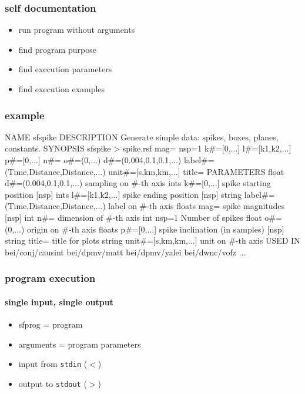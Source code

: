 \begin{frame} \frametitle{self documentation}

  \begin{itemize}
  \item run program without arguments
  \item find program purpose
  \item find execution parameters
  \item find execution examples
  \end{itemize}
  
\end{frame}
\cwpnote{}

\begin{frame}[fragile] \frametitle{example}


\tiny
\begin{semiverbatim}
NAME
        sfspike
DESCRIPTION
        Generate simple data: spikes, boxes, planes, constants.
SYNOPSIS
        sfspike > spike.rsf mag= nsp=1 k#=[0,...] l#=[k1,k2,...] p#=[0,...] n#=
o#=(0,...) d#=(0.004,0.1,0.1,...) label#=(Time,Distance,Distance,...) unit#=[s,km,km,...] title=
PARAMETERS
        float   d#=(0.004,0.1,0.1,...)  sampling on #-th axis
        ints    k#=[0,...]      spike starting position  [nsp]
        ints    l#=[k1,k2,...]  spike ending position  [nsp]
        string  label#=(Time,Distance,Distance,...)     label on #-th axis
        floats  mag=    spike magnitudes  [nsp]
        int     n#=     dimension of #-th axis
        int     nsp=1   Number of spikes
        float   o#=(0,...)      origin on #-th axis
        floats  p#=[0,...]      spike inclination (in samples)  [nsp]
        string  title=  title for plots
        string  unit#=[s,km,km,...]     unit on #-th axis
USED IN
        bei/conj/causint
        bei/dpmv/matt
        bei/dpmv/yalei
        bei/dwnc/vofz
	...
\end{semiverbatim}
\end{frame}
\cwpnote{}

\begin{frame} \frametitle{program execution}
  \framesubtitle{single input, single output}

  
  \vfill
  
  \begin{itemize}
  \item sfprog = \mg program
  \item arguments = program parameters
  \item input from \texttt{stdin} ($<$)
  \item output to \texttt{stdout} ($>$)
  \end{itemize}
  
\end{frame}
\cwpnote{}

